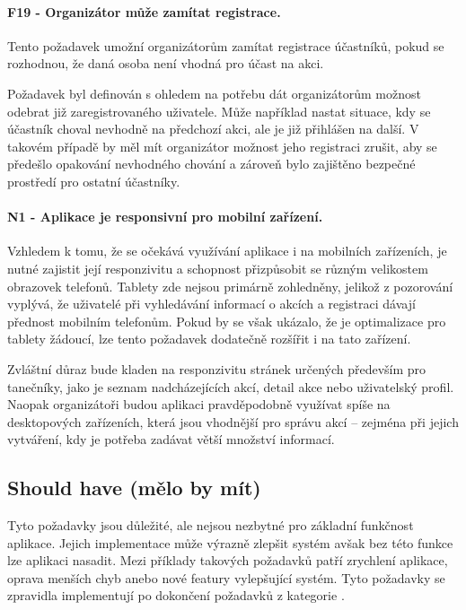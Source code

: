 \paragraph{F19 - Organizátor může zamítat registrace.}\label{req:F19}
Tento požadavek umožní organizátorům zamítat registrace účastníků, pokud se rozhodnou, že daná osoba není vhodná pro účast na akci.

Požadavek byl definován s ohledem na potřebu dát organizátorům možnost odebrat již zaregistrovaného uživatele. Může například nastat situace, kdy se účastník choval nevhodně na předchozí akci, ale je již přihlášen na další. V takovém případě by měl mít organizátor možnost jeho registraci zrušit, aby se předešlo opakování nevhodného chování a zároveň bylo zajištěno bezpečné prostředí pro ostatní účastníky.

\paragraph{N1 - Aplikace je responsivní pro mobilní zařízení.}\label{req:N1}
Vzhledem k tomu, že se očekává využívání aplikace i na mobilních zařízeních, je nutné zajistit její responzivitu a schopnost přizpůsobit se různým velikostem obrazovek telefonů. Tablety zde nejsou primárně zohledněny, jelikož z pozorování vyplývá, že uživatelé při vyhledávání informací o akcích a registraci dávají přednost mobilním telefonům. Pokud by se však ukázalo, že je optimalizace pro tablety žádoucí, lze tento požadavek dodatečně rozšířit i na tato zařízení.

Zvláštní důraz bude kladen na responzivitu stránek určených především pro tanečníky, jako je seznam nadcházejících akcí, detail akce nebo uživatelský profil. Naopak organizátoři budou aplikaci pravděpodobně využívat spíše na desktopových zařízeních, která jsou vhodnější pro správu akcí – zejména při jejich vytváření, kdy je potřeba zadávat větší množství informací.

\subsection{Should have (mělo by mít)}
Tyto požadavky jsou důležité, ale nejsou nezbytné pro základní funkčnost aplikace. Jejich implementace může výrazně zlepšit systém avšak bez této funkce lze aplikaci nasadit. Mezi příklady takových požadavků patří zrychlení aplikace, oprava menších chyb anebo nové featury vylepšující systém. Tyto požadavky se zpravidla implementují po dokončení požadavků z kategorie .\cite{moscow:definition}

